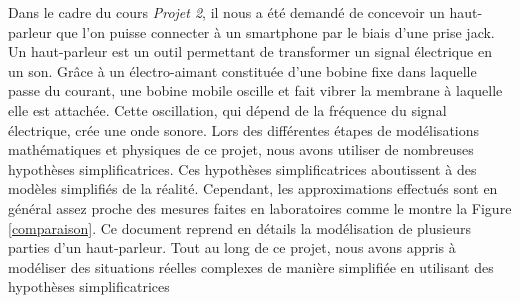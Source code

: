 

\begin{abstract-fr}
Dans le cadre du cours \textit{Projet 2}, il nous a été demandé
de concevoir un haut-parleur que l'on puisse connecter à un smartphone
par le biais d'une prise jack.
Un haut-parleur est un outil permettant de transformer un signal 
électrique en un son. Grâce à un électro-aimant constituée d'une 
bobine fixe dans laquelle passe du courant, une bobine mobile 
oscille et fait vibrer la membrane à laquelle elle est attachée. 
Cette oscillation, qui dépend de la fréquence du signal électrique, 
crée une onde sonore.
Lors des différentes étapes de modélisations mathématiques et physiques
de ce projet, nous avons utiliser de nombreuses hypothèses simplificatrices. 
Ces hypothèses simplificatrices aboutissent à des modèles simplifiés de la
réalité. Cependant, les approximations effectués sont en général assez proche
des mesures faites en laboratoires comme le montre la Figure \ref{comparaison}.
Ce document reprend en détails la modélisation de plusieurs parties d'un haut-parleur.
Tout au long de ce projet, nous avons appris à modéliser des situations réelles
complexes de manière simplifiée en utilisant des hypothèses simplificatrices

\end{abstract-fr}

\begin{figure}
	\centering
	
	\caption{}
\end{figure}



